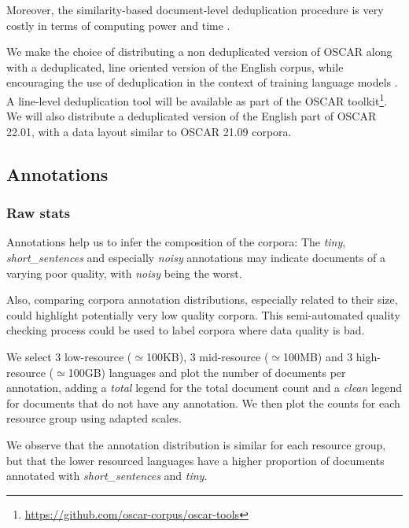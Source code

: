 Moreover, the similarity-based document-level deduplication procedure is very costly in terms of computing power and time \cite{gao-etal-2020-pile}.

We make the choice of distributing a non deduplicated version of OSCAR along with a deduplicated, line oriented version of the English corpus, while encouraging the use of deduplication in the context of training language models \cite{lee-etal-2021-deduplicating}.
A line-level deduplication tool will be available as part of the OSCAR toolkit\footnote{\url{https://github.com/oscar-corpus/oscar-tools}}. We will also distribute a deduplicated version of the English part of OSCAR 22.01, with a data layout similar to OSCAR 21.09 corpora.


\subsection{Annotations}

\subsubsection{Raw stats}

Annotations help us to infer the composition of the corpora: The \textit{tiny}, \textit{short\_sentences} and especially \textit{noisy} annotations may indicate documents of a varying poor quality, with \textit{noisy} being the worst.

Also, comparing corpora annotation distributions, especially related to their size, could highlight potentially very low quality corpora. This semi-automated quality checking process could be used to label corpora where data quality is bad.

We select 3 low-resource ($\simeq$100KB), 3 mid-resource ($\simeq$100MB) and 3 high-resource ($\simeq$100GB) languages and plot the number of documents per annotation, adding a \textit{total} legend for the total document count and a \textit{clean} legend for documents that do not have any annotation. We then plot the counts for each resource group using adapted scales.

We observe that the annotation distribution is similar for each resource group, but that the lower resourced languages have a higher proportion of documents annotated with \textit{short\_sentences} and \textit{tiny}.

